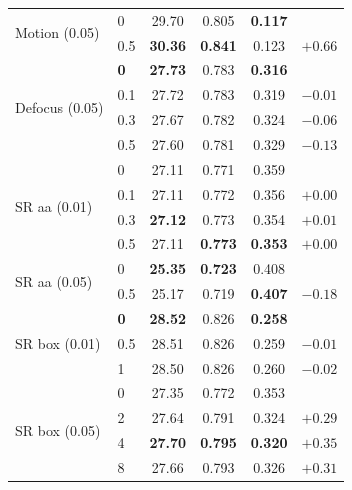 \documentclass[11pt]{article}
\begin{document}
\begin{table}[h]
\begin{tabular}{llcccc}
\midrule
\multirow{2}{*}{Motion (0.05)}     & 0    & 29.70 & 0.805 & \textbf{0.117} & \\
                                   & 0.5  & \textbf{30.36} & \textbf{0.841} & 0.123 & $+0.66$ \\
\midrule
\multirow{4}{*}{Defocus (0.05)}    & \textbf{0}    & \textbf{27.73} & 0.783 & \textbf{0.316} & \\
                                   & 0.1  & 27.72 & 0.783 & 0.319 & $-0.01$ \\
                                   & 0.3  & 27.67 & 0.782 & 0.324 & $-0.06$ \\
                                   & 0.5  & 27.60 & 0.781 & 0.329 & $-0.13$ \\
\midrule
\multirow{4}{*}{SR aa (0.01)}      & 0    & 27.11 & 0.771 & 0.359 & \\
                                     & 0.1  & 27.11 & 0.772 & 0.356 & $+0.00$ \\
                                     & 0.3  & \textbf{27.12} & 0.773 & 0.354 & $+0.01$ \\
                                     & 0.5  & 27.11 & \textbf{0.773} & \textbf{0.353} & $+0.00$ \\
\midrule
\multirow{2}{*}{SR aa (0.05)}      & 0    & \textbf{25.35} & \textbf{0.723} & 0.408 & \\
                                     & 0.5  & 25.17 & 0.719 & \textbf{0.407} & $-0.18$ \\
\midrule
\multirow{3}{*}{SR box (0.01)}     & \textbf{0}    & \textbf{28.52} & 0.826 & \textbf{0.258} & \\
                                     & 0.5  & 28.51 & 0.826 & 0.259 & $-0.01$ \\
                                     & 1    & 28.50 & 0.826 & 0.260 & $-0.02$ \\
\midrule
\multirow{4}{*}{SR box (0.05)}     & 0    & 27.35 & 0.772 & 0.353 & \\
                                     & 2    & 27.64 & 0.791 & 0.324 & $+0.29$ \\
                                     & 4    & \textbf{27.70} & \textbf{0.795} & \textbf{0.320} & $+0.35$ \\
                                     & 8    & 27.66 & 0.793 & 0.326 & $+0.31$ \\
\bottomrule
\end{tabular}
\end{table}
\end{document}
